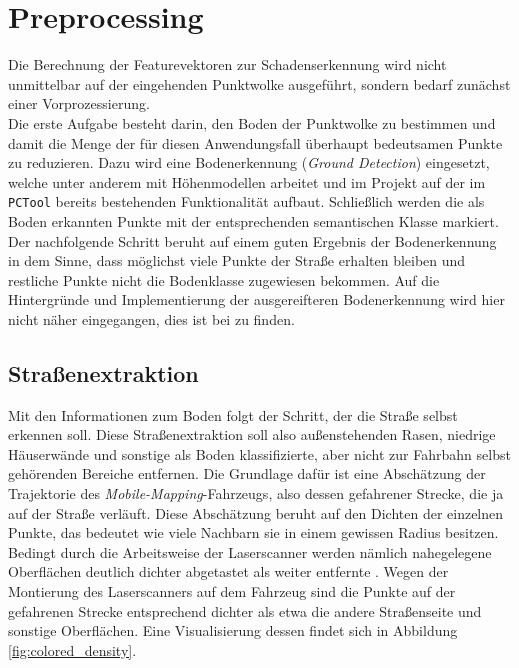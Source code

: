 
\chapter{Preprocessing}
\label{chap:preproc}

Die Berechnung der Featurevektoren zur Schadenserkennung wird nicht unmittelbar auf der eingehenden Punktwolke ausgeführt, sondern bedarf zunächst einer Vorprozessierung. \\
Die erste Aufgabe besteht darin, den Boden der Punktwolke zu bestimmen und damit die Menge der für diesen Anwendungsfall überhaupt bedeutsamen Punkte zu reduzieren. Dazu wird eine Bodenerkennung (\textit{Ground Detection}) eingesetzt, welche unter anderem mit Höhenmodellen arbeitet und im Projekt auf der im \texttt{PCTool} bereits bestehenden Funktionalität aufbaut. Schließlich werden die als Boden erkannten Punkte mit der entsprechenden semantischen Klasse markiert. Der nachfolgende Schritt beruht auf einem guten Ergebnis der Bodenerkennung in dem Sinne, dass möglichst viele Punkte der Straße erhalten bleiben und restliche Punkte nicht die Bodenklasse zugewiesen bekommen. Auf die Hintergründe und Implementierung der ausgereifteren Bodenerkennung wird hier nicht näher eingegangen, dies ist bei \cite{Mattes-2021} zu finden.

\section{Straßenextraktion}

Mit den Informationen zum Boden folgt der Schritt, der die Straße selbst erkennen soll. Diese Straßenextraktion soll also außenstehenden Rasen, niedrige Häuserwände und sonstige als Boden klassifizierte, aber nicht zur Fahrbahn selbst gehörenden Bereiche entfernen. Die Grundlage dafür ist eine Abschätzung der Trajektorie des \textit{Mobile-Mapping}-Fahrzeugs, also dessen gefahrener Strecke, die ja auf der Straße verläuft. Diese Abschätzung beruht auf den Dichten der einzelnen Punkte, das bedeutet wie viele Nachbarn sie in einem gewissen Radius besitzen. Bedingt durch die Arbeitsweise der Laserscanner werden nämlich nahegelegene Oberflächen deutlich dichter abgetastet als weiter entfernte \citep{Li.etal-2019}. Wegen der Montierung des Laserscanners auf dem Fahrzeug sind die Punkte auf der gefahrenen Strecke entsprechend dichter als etwa die andere Straßenseite und sonstige Oberflächen. Eine Visualisierung dessen findet sich in Abbildung \ref{fig:colored_density}. \\

